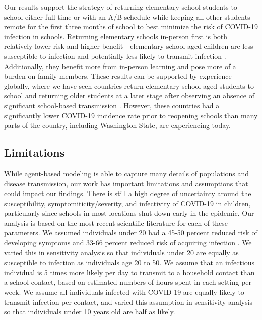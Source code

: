 \documentclass[preprint,12pt]{elsarticle}
\begin{document}
Our results support the strategy of returning elementary school students to school either full-time or with an A/B schedule while keeping all other students remote for the first three months of school to best minimize the risk of COVID-19 infection in schools. Returning elementary schools in-person first is both relatively lower-risk and higher-benefit—elementary school aged children are less susceptible to infection \cite{zhang_changes_2020} and potentially less likely to transmit infection \cite{park_early_nodate}. Additionally, they benefit more from in-person learning and pose more of a burden on family members. These results can be supported by experience globally, where we have seen countries return elementary school aged students to school and returning older students at a later stage after observing an absence of significant school-based transmission \cite{zhang_changes_2020, auger_association_2020}. However, these countries had a significantly lower COVID-19 incidence rate prior to reopening schools than many parts of the country, including Washington State, are experiencing today.

\subsection{Limitations}

While agent-based modeling is able to capture many details of populations and disease transmission, our work has important limitations and assumptions that could impact our findings. There is still a high degree of uncertainty around the susceptibility, symptomiticity/severity, and infectivity of COVID-19 in children, particularly since schools in most locations shut down early in the epidemic. Our analysis is based on the most recent scientific literature for each of these parameters. We assumed individuals under 20 had a 45-50 percent reduced risk of developing symptoms \cite{davies_age-dependent_nodate} and 33-66 percent reduced risk of acquiring infection \cite{zhang_changes_2020}. We varied this in sensitivity analysis so that individuals under 20 are equally as susceptible to infection as individuals age 20 to 50. We assume that an infectious individual is 5 times more likely per day to transmit to a household contact than a school contact, based on estimated numbers of hours spent in each setting per week. We assume all individuals infected with COVID-19 are equally likely to transmit infection per contact, and varied this assumption in sensitivity analysis so that individuals under 10 years old are half as likely.
\end{document}
